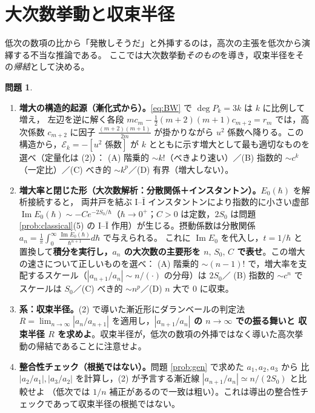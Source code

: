\documentclass[dvipdfmx, uplatex]{jsarticle}
\newcommand{\hb}{\hbar}
\newcommand{\cE}{\mathcal{E}}
\theoremstyle{definition}
\newtheorem{prob}{問題}
\begin{document}
\section{大次数挙動と収束半径}
低次の数項の比から「発散しそうだ」と外挿するのは，高次の主張を低次から演繹する不当な推論である。
ここでは大次数挙動\emph{そのもの}を導き，収束半径をその\emph{帰結}として決める。

\begin{prob}\label{prob:asym}
\begin{enumerate}
\item \textbf{増大の構造的起源（漸化式から）。}\eqref{eq:BW} で $\deg P_k=3k$ は $k$ に比例して増え，
左辺を逆に解く各段 $mc_m-\tfrac12(m+2)(m+1)c_{m+2}=r_m$ では，高次係数 $c_{m+2}$ に因子
$\tfrac{(m+2)(m+1)}{2m}$ が掛かりながら $u^2$ 係数へ降りる。この構造から，$\cE_k=-[u^2\text{ 係数}]$ が
$k$ とともに示す増大として最も適切なものを選べ（定量化は (2)）：
(A) 階乗的 $\sim k!$（べきより速い）／(B) 指数的 $\sim c^k$（一定比）／(C) べき的 $\sim k^p$／(D) 有界（増大しない）。
\item \textbf{増大率と閉じた形（大次数解析：分散関係＋インスタントン）。}$E_0(\hb)$ を解析接続すると，
両井戸を結ぶ I--$\bar{\mathrm I}$ インスタントンにより指数的に小さい虚部
$\operatorname{Im}E_0(\hb)\sim-Ce^{-2S_0/\hb}$（$\hb\to0^+$；$C>0$ は定数，$2S_0$ は問題 \ref{prob:classical}(5) の
I--$\bar{\mathrm I}$ 作用）が生じる。摂動係数は分散関係
$a_n=\tfrac1\pi\int_0^\infty\frac{\operatorname{Im}E_0(\hb)}{\hb^{n+1}}d\hb$ で与えられる。
これに $\operatorname{Im}E_0$ を代入し，$t=1/\hb$ と置換して\textbf{積分を実行し，$a_n$ の大次数の主要形を
$n,\,S_0,\,C$ で表せ}。この増大の速さについて正しいものを選べ：
(A) 階乗的 $\sim(n-1)!$ で，増大率を支配するスケール（$|a_{n+1}/a_n|\sim n/(\cdot)$ の分母）は $2S_0$／
(B) 指数的 $\sim c^n$ でスケールは $S_0$／(C) べき的 $\sim n^p$／(D) $n$ 大で $0$ に収束。
\item \textbf{系：収束半径。}(2) で導いた漸近形にダランベールの判定法
$R=\lim_{n\to\infty}|a_n/a_{n+1}|$ を適用し，\textbf{$|a_{n+1}/a_n|$ の $n\to\infty$ での振る舞いと
収束半径 $R$ を求めよ}。収束半径が，低次の数項の外挿ではなく導いた高次挙動の帰結であることに注意せよ。
\item \textbf{整合性チェック（根拠ではない）。}問題 \ref{prob:gen} で求めた $a_1,a_2,a_3$ から
比 $|a_2/a_1|,|a_3/a_2|$ を計算し，(2) が予言する漸近線 $|a_{n+1}/a_n|\simeq n/(2S_0)$ と比較せよ
（低次では $1/n$ 補正があるので一致は粗い）。これは導出の整合性チェックであって収束半径の根拠ではない。
\end{enumerate}
\end{prob}
\end{document}
